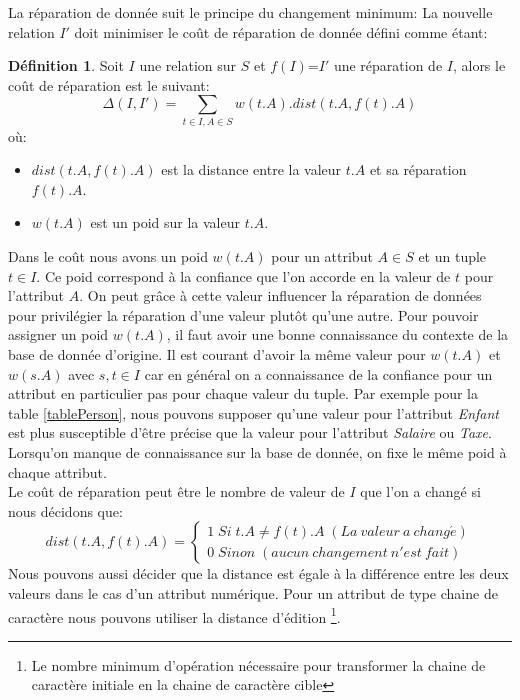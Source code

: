 \documentclass[letterpaper, 12pt]{report}
\theoremstyle{definition}
\newtheorem{mydef}{Définition}
\begin{document}

La réparation de donnée suit le principe du changement minimum: La nouvelle relation $I'$ doit minimiser le coût de réparation de donnée défini comme étant:

\begin{mydef}
 Soit $I$ une relation sur $S$ et $f(I)$=$I'$ une réparation de $I$, alors le coût de réparation est le suivant:
 $$ \Delta(I,I') = \sum_{t \in I, A \in S} w(t.A).dist(t.A,f(t).A) $$
 où:
 \begin{itemize}
 	\item $dist(t.A,f(t).A)$ est la distance entre la valeur $t.A$ et sa réparation $f(t).A$.
 	\item $w(t.A)$ est un poid sur la valeur $t.A$.
 \end{itemize}
\end{mydef}

Dans le coût nous avons un poid $w(t.A)$ pour un attribut $A \in S$ et un tuple $t \in I$. Ce poid correspond à la confiance que l'on accorde en la valeur de $t$ pour l'attribut $A$. On peut grâce à cette valeur influencer la réparation de données pour privilégier la réparation d'une valeur plutôt qu'une autre. Pour pouvoir assigner un poid $w(t.A)$, il faut avoir une bonne connaissance du contexte de la base de donnée d'origine. Il est courant d'avoir la même valeur pour $w(t.A)$ et $w(s.A)$ avec $s,t \in I$ car en général on a connaissance de la confiance pour un attribut en particulier pas pour chaque valeur du tuple. Par exemple pour la table \ref{tablePerson}, nous pouvons supposer qu'une valeur pour l'attribut \emph{Enfant} est plus susceptible d'être précise que la valeur pour l'attribut \emph{Salaire} ou \emph{Taxe}. Lorsqu'on manque de connaissance sur la base de donnée, on fixe le même poid à chaque attribut.\\

Le coût de réparation peut être le nombre de valeur de $I$ que l'on a changé si nous décidons que:
$$
dist(t.A,f(t).A) =
\left\{
	\begin{array}{ll}
	  1 \; Si\; t.A \neq f(t).A \;(La\ valeur\ a\ chang\acute{e}) \\
	  0 \; Sinon\;(aucun\ changement\ n'est\ fait)
	\end{array}
\right.
$$
Nous pouvons aussi décider que la distance est égale à la différence entre les deux valeurs dans le cas d'un attribut numérique. Pour un attribut de type chaine de caractère nous pouvons utiliser la distance d'édition \footnote{Le nombre minimum d'opération nécessaire pour transformer la chaine de caractère initiale en la chaine de caractère cible}.\\
\end{document}
